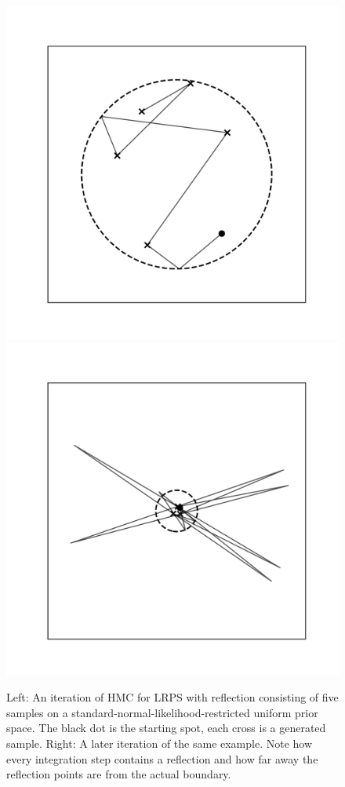 \documentclass[12pt, a4paper]{report}
\begin{document}
\begin{figure}
    \centering
    \includegraphics[scale=0.45]{figs/hmc_reflection_example.png}
    \includegraphics[scale=0.45]{figs/hmc_reflection_degenerate_example.png}
    \caption{Left: An iteration of HMC for LRPS with reflection consisting of five samples on a standard-normal-likelihood-restricted uniform prior space.
    The black dot is the starting spot, each cross is a generated sample. Right: A later iteration of the same example. Note how every integration step contains a reflection and how far away the reflection points are from the actual boundary.}
    \label{fig:hmc_reflection_example}
\end{figure}
\end{document}
